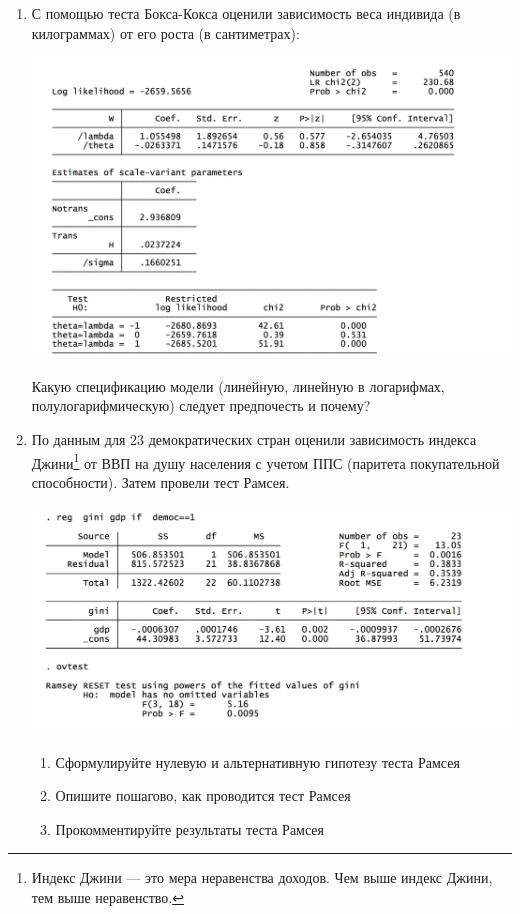 \documentclass[12pt, a4paper]{article}
\begin{document}
\begin{enumerate}
\item С помощью теста Бокса-Кокса оценили зависимость веса индивида (в килограммах) от его роста (в сантиметрах):

\includegraphics[width=\textwidth]{figures/box_cox.png}

Какую спецификацию модели (линейную, линейную в логарифмах, полулогарифмическую) следует предпочесть и почему?


\item По данным для  23 демократических стран оценили зависимость индекса Джини\footnote{Индекс Джини — это мера неравенства доходов. Чем выше индекс Джини, тем выше неравенство.} от ВВП на душу населения с учетом ППС (паритета покупательной способности). Затем провели тест Рамсея.

\includegraphics[width=\textwidth]{figures/ramsey.png}

\begin{enumerate}
\item Сформулируйте нулевую и альтернативную гипотезу теста Рамсея
\item Опишите пошагово, как проводится тест Рамсея
\item Прокомментируйте результаты теста Рамсея
\end{enumerate}

\end{enumerate}
\end{document}

